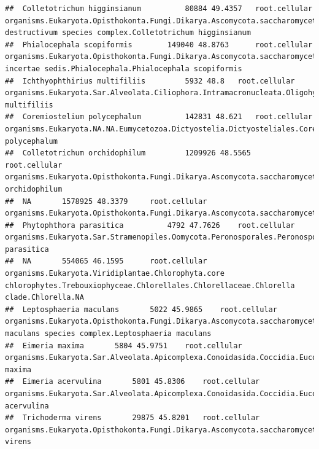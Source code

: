 \documentclass{article}\usepackage[]{graphicx}\usepackage[]{color}
\makeatletter
\newenvironment{kframe}{%
 \def\at@end@of@kframe{}%
 \ifinner\ifhmode%
  \def\at@end@of@kframe{\end{minipage}}%
  \begin{minipage}{\columnwidth}%
 \fi\fi%
 \def\FrameCommand##1{\hskip\@totalleftmargin \hskip-\fboxsep
 \colorbox{shadecolor}{##1}\hskip-\fboxsep
     \hskip-\linewidth \hskip-\@totalleftmargin \hskip\columnwidth}%
 \MakeFramed {\advance\hsize-\width
   \@totalleftmargin\z@ \linewidth\hsize
   \@setminipage}}%
 {\par\unskip\endMakeFramed%
 \at@end@of@kframe}
\newenvironment{knitrout}{}{} %
\makeatother
\begin{document}
\begin{knitrout}
\begin{kframe}
\begin{verbatim}
##  Colletotrichum higginsianum 		 80884 49.4357 	 root.cellular organisms.Eukaryota.Opisthokonta.Fungi.Dikarya.Ascomycota.saccharomyceta.Pezizomycotina.leotiomyceta.sordariomyceta.Sordariomycetes.Hypocreomycetidae.Glomerellales.NA.Colletotrichum.Colletotrichum destructivum species complex.Colletotrichum higginsianum
##  Phialocephala scopiformis 		 149040 48.8763 	 root.cellular organisms.Eukaryota.Opisthokonta.Fungi.Dikarya.Ascomycota.saccharomyceta.Pezizomycotina.leotiomyceta.sordariomyceta.Leotiomycetes.Helotiales.Helotiales incertae sedis.Phialocephala.Phialocephala scopiformis
##  Ichthyophthirius multifiliis 		 5932 48.8 	 root.cellular organisms.Eukaryota.Sar.Alveolata.Ciliophora.Intramacronucleata.Oligohymenophorea.Hymenostomatida.Ophryoglenina.Ichthyophthirius.Ichthyophthirius multifiliis
##  Coremiostelium polycephalum 		 142831 48.621 	 root.cellular organisms.Eukaryota.NA.NA.Eumycetozoa.Dictyostelia.Dictyosteliales.Coremiostelium.Coremiostelium polycephalum
##  Colletotrichum orchidophilum 		 1209926 48.5565 	 root.cellular organisms.Eukaryota.Opisthokonta.Fungi.Dikarya.Ascomycota.saccharomyceta.Pezizomycotina.leotiomyceta.sordariomyceta.Sordariomycetes.Hypocreomycetidae.Glomerellales.NA.Colletotrichum.Colletotrichum orchidophilum
##  NA 		 1578925 48.3379 	 root.cellular organisms.Eukaryota.Opisthokonta.Fungi.Dikarya.Ascomycota.saccharomyceta.Pezizomycotina.leotiomyceta.sordariomyceta.Sordariomycetes.Sordariomycetidae.NA.Pyriculariaceae.Pyricularia.NA
##  Phytophthora parasitica 		 4792 47.7626 	 root.cellular organisms.Eukaryota.Sar.Stramenopiles.Oomycota.Peronosporales.Peronosporaceae.Phytophthora.Phytophthora parasitica
##  NA 		 554065 46.1595 	 root.cellular organisms.Eukaryota.Viridiplantae.Chlorophyta.core chlorophytes.Trebouxiophyceae.Chlorellales.Chlorellaceae.Chlorella clade.Chlorella.NA
##  Leptosphaeria maculans 		 5022 45.9865 	 root.cellular organisms.Eukaryota.Opisthokonta.Fungi.Dikarya.Ascomycota.saccharomyceta.Pezizomycotina.leotiomyceta.dothideomyceta.Dothideomycetes.Pleosporomycetidae.Pleosporales.Pleosporineae.Leptosphaeriaceae.Leptosphaeria.Leptosphaeria maculans species complex.Leptosphaeria maculans
##  Eimeria maxima 		 5804 45.9751 	 root.cellular organisms.Eukaryota.Sar.Alveolata.Apicomplexa.Conoidasida.Coccidia.Eucoccidiorida.Eimeriorina.Eimeriidae.Eimeria.Eimeria maxima
##  Eimeria acervulina 		 5801 45.8306 	 root.cellular organisms.Eukaryota.Sar.Alveolata.Apicomplexa.Conoidasida.Coccidia.Eucoccidiorida.Eimeriorina.Eimeriidae.Eimeria.Eimeria acervulina
##  Trichoderma virens 		 29875 45.8201 	 root.cellular organisms.Eukaryota.Opisthokonta.Fungi.Dikarya.Ascomycota.saccharomyceta.Pezizomycotina.leotiomyceta.sordariomyceta.Sordariomycetes.Hypocreomycetidae.Hypocreales.Hypocreaceae.Trichoderma.Trichoderma virens

\end{verbatim}
\end{kframe}
\end{knitrout}
\end{document}

